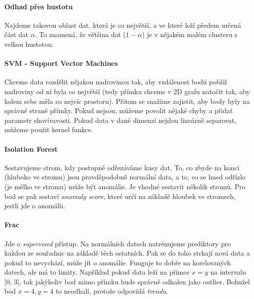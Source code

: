 \documentclass[10pt,a4paper]{article}
\begin{document}
\paragraph{Odhad přes hustotu} Najdeme takovou oblast dat, která je co největší, a ve které leží předem určená část dat $\alpha$. To znamená, že většina dat ($1 - \alpha$) je v nějakém malém clusteru s velkou hustotou.

\paragraph{SVM - Support Vector Machines} Chceme data rozdělit nějakou nadrovinou tak, aby vzdálenost bodů poblíž nadroviny od ní byla co největší (tedy přímku chceme v 2D grafu natočit tak, aby kolem sebe měla co nejvíc prostoru). Přitom se snažíme zajistit, aby body byly na správné straně přímky. Pokud nejsou, můžeme povolit nějaké chyby a přidat parametr shovívavosti. Pokud data v dané dimenzi nejdou lineárně separovat, můžeme použít kernel funkce.

\paragraph{Isolation Forest} Sestavujeme strom, kdy postupně odřezáváme kusy dat. To, co zbyde na konci (hluboko ve stromu) jsou pravděpodobně normální data, a to, co se hned odřízlo (je mělko ve stromu) může být anomálie. Je vhodné sestavit několik stromů. Pro bod se pak sestaví \textit{anomaly score}, které určí na základě hloubek ve stromech, jestli jde o anomálii.

\paragraph{Frac} Jde o \textit{supervised} přístup. Na normálních datech natrénujeme prediktory pro každou ze souřadnic na základě těch ostatních. Pak se do toho strkají nová data a pokud to nevychází, může jít o anomálie. Funguje to dobře na korelovaných datech, ale má to limity. Například pokud data leží na přímce $x=y$ na intervalu [0, 3], tak jakýkoliv bod mimo přímku bude správně odhalen jako outlier. Bohužel bod $x=4, y=4$ to neodhalí, protože odpovídá \textit{trendu}.
\end{document}
